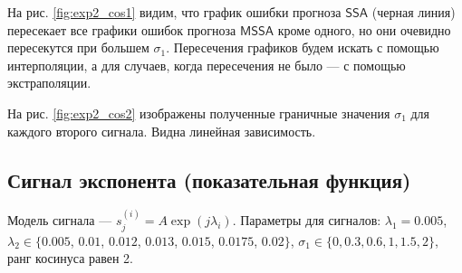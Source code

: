 \documentclass[specialist, substylefile = spbureport.rtx,
    subf,href,colorlinks=true, 12pt]{disser}
\newcommand{\SSA}{\mathsf{SSA}}
\newcommand{\MSSA}{\mathsf{MSSA}}
\begin{document}
        На рис. \ref{fig:exp2_cos1} видим, что график ошибки прогноза $\SSA$ (черная линия) пересекает все графики ошибок прогноза $\MSSA$ кроме одного, но они очевидно пересекутся при большем $\sigma_1$. Пересечения графиков будем искать с помощью интерполяции, а для случаев, когда пересечения не было --- с помощью экстраполяции. 

        На рис. \ref{fig:exp2_cos2} изображены полученные граничные значения $\sigma_1$ для каждого второго сигнала. Видна линейная зависимость.

    \subsection{Сигнал экспонента (показательная функция)}
        Модель сигнала --- $s^{(i)}_j = A \exp(j\lambda_i)$. Параметры для сигналов: $\lambda_1 = 0.005$, $\lambda_2 \in \{0.005$, $0.01$, $0.012$, $0.013$, $0.015$, $0.0175$, $0.02\}$, $\sigma_1 \in \{0, 0.3, 0.6, 1, 1.5, 2\}$, ранг косинуса равен 2.
\end{document}

